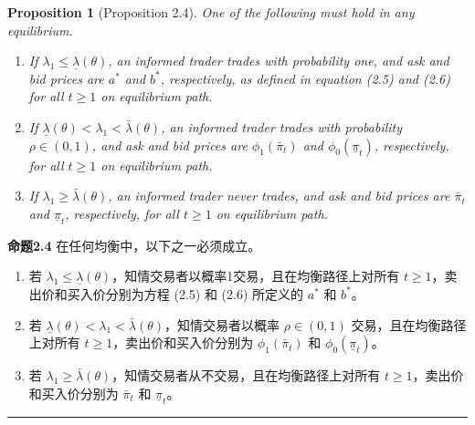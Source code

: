 \documentclass[12pt,a4paper]{article}
\newenvironment{translation}{%
  \par\vspace{2pt}\noindent%
  \color{transblue}%
  \ignorespaces
}{%
  \par\vspace{4pt}\hrule\vspace{6pt}%
}
\newtheorem{proposition}[theorem]{Proposition}
\begin{document}
\begin{proposition}[Proposition 2.4]
One of the following must hold in any equilibrium.
\begin{enumerate}[label=(\roman*)]
\item If $\lambda_1 \leq \underline{\lambda}(\theta)$, an informed trader trades with probability one, and ask and bid prices are $a^*$ and $b^*$, respectively, as defined in equation (2.5) and (2.6) for all $t \geq 1$ on equilibrium path.
\item If $\underline{\lambda}(\theta) < \lambda_1 < \bar{\lambda}(\theta)$, an informed trader trades with probability $\rho \in (0, 1)$, and ask and bid prices are $\phi_1(\bar{\pi}_t)$ and $\phi_0(\underline{\pi}_t)$, respectively, for all $t \geq 1$ on equilibrium path.
\item If $\lambda_1 \geq \bar{\lambda}(\theta)$, an informed trader never trades, and ask and bid prices are $\bar{\pi}_t$ and $\underline{\pi}_t$, respectively, for all $t \geq 1$ on equilibrium path.
\end{enumerate}
\end{proposition}
\begin{translation}
\textbf{命题2.4} 在任何均衡中，以下之一必须成立。
\begin{enumerate}[label=(\roman*)]
\item 若 $\lambda_1 \leq \underline{\lambda}(\theta)$，知情交易者以概率1交易，且在均衡路径上对所有 $t \geq 1$，卖出价和买入价分别为方程 (2.5) 和 (2.6) 所定义的 $a^*$ 和 $b^*$。
\item 若 $\underline{\lambda}(\theta) < \lambda_1 < \bar{\lambda}(\theta)$，知情交易者以概率 $\rho \in (0, 1)$ 交易，且在均衡路径上对所有 $t \geq 1$，卖出价和买入价分别为 $\phi_1(\bar{\pi}_t)$ 和 $\phi_0(\underline{\pi}_t)$。
\item 若 $\lambda_1 \geq \bar{\lambda}(\theta)$，知情交易者从不交易，且在均衡路径上对所有 $t \geq 1$，卖出价和买入价分别为 $\bar{\pi}_t$ 和 $\underline{\pi}_t$。
\end{enumerate}
\end{translation}
\end{document}
